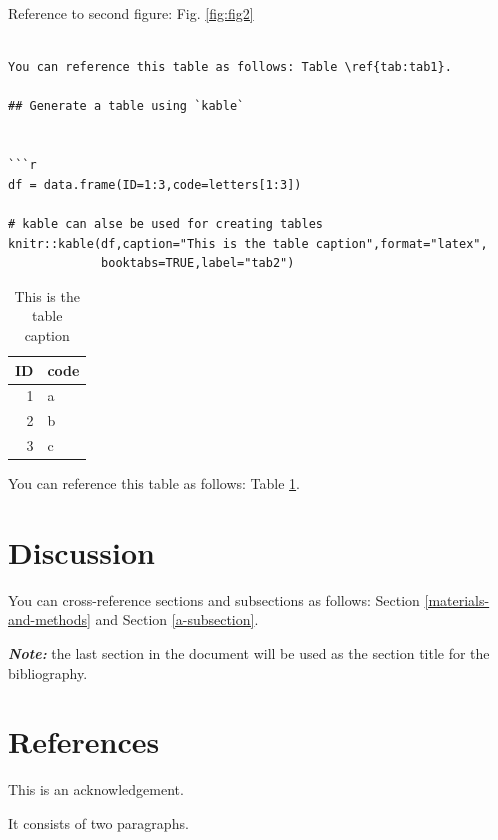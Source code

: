 \documentclass[12pt,halfline,a4paper,]{ouparticle}
\begin{document}
Reference to second figure: Fig. \ref{fig:fig2}

\begin{verbatim}

You can reference this table as follows: Table \ref{tab:tab1}.

## Generate a table using `kable`


```r
df = data.frame(ID=1:3,code=letters[1:3])

# kable can alse be used for creating tables
knitr::kable(df,caption="This is the table caption",format="latex",
             booktabs=TRUE,label="tab2")
\end{verbatim}

\begin{table}

\caption{\label{tab:tab2}This is the table caption}
\centering
\begin{tabular}[t]{rl}
\toprule
ID & code\\
\midrule
1 & a\\
2 & b\\
3 & c\\
\bottomrule
\end{tabular}
\end{table}

You can reference this table as follows: Table \ref{tab:tab2}.

\hypertarget{discussion}{%
\section{Discussion}\label{discussion}}

You can cross-reference sections and subsections as follows: Section
\ref{materials-and-methods} and Section \ref{a-subsection}.

\textbf{\emph{Note:}} the last section in the document will be used as
the section title for the bibliography.

\hypertarget{references}{%
\section{References}\label{references}}


\begin{notes}[Acknowledgements]
This is an acknowledgement.

It consists of two paragraphs.
\end{notes}
\end{document}
